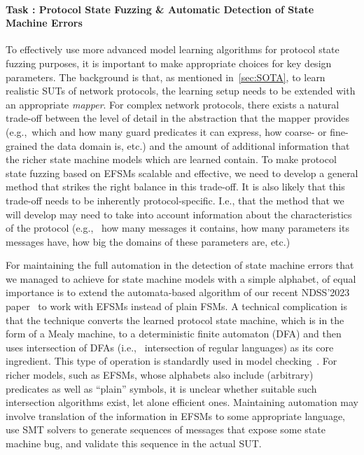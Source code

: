 \documentclass[11pt]{article}
\newcounter{Task}
\newcommand{\task}[1]{\addtocounter{Task}{1}\paragraph{Task \theTask: #1}}
\newcommand{\myparagraph}{}
\let\myparagraph=\paragraph
\renewcommand{\paragraph}{\vspace{-3mm}\myparagraph}
\newcommand{\eg}{e.\/g.,\ }
\newcommand{\ie}{i.\/e.,\ }
\begin{document}
\task{Protocol State Fuzzing \& Automatic Detection of State Machine Errors}
To effectively use more advanced model learning algorithms for protocol
state fuzzing purposes, it is important to make appropriate choices for key design parameters.
The background is that, as mentioned in~\cref{sec:SOTA}, to learn realistic SUTs of network protocols,
the learning setup needs to be extended with an appropriate \emph{mapper}.
For complex network protocols, there exists a natural trade-off between the
level of detail in the abstraction that the mapper provides (\eg which and how
many guard predicates it can express, how coarse- or fine-grained the data
domain is, etc.) and the amount of additional information that the richer
state machine models which are learned contain.  To make protocol state
fuzzing based on EFSMs scalable and effective,
we need to develop a general method that strikes the right balance in this
trade-off.
%
It is also likely that this trade-off needs to be inherently
protocol-specific.  I.e., that the method that we will develop may need to
take into account information about the characteristics of the protocol (\eg
how many messages it contains, how many parameters its messages have, how big
the domains of these parameters are, etc.)

For maintaining the full automation in the detection of state machine errors
that we managed to achieve for state machine models with a simple alphabet, of
equal importance is to extend the automata-based algorithm of our recent
NDSS'2023 paper~\cite{AutomataBased@NDSS-23} to work with EFSMs instead of
plain FSMs.  A technical complication is that the technique converts the
learned protocol state machine, which is in the form of a Mealy machine, to a
deterministic finite automaton (DFA) and then uses intersection of DFAs (\ie
intersection of regular languages) as its core ingredient. This type of operation is
standardly used in model checking~\cite{MC:handbook}.
For richer models, such as EFSMs, whose alphabets also include (arbitrary)
predicates as well as ``plain'' symbols, it is unclear whether suitable such
intersection algorithms exist, let alone efficient ones. Maintaining
automation may involve translation of the information in EFSMs to some
appropriate language, use SMT solvers to generate sequences of messages that
expose some state machine bug, and validate this sequence in the actual SUT.
\end{document}
